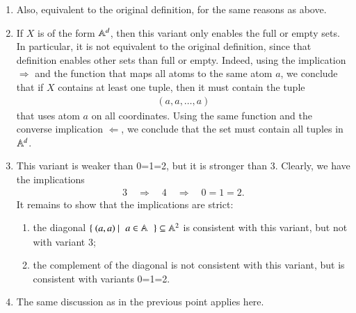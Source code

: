 {\begin{enumerate}
\begin{align*}
            (a_1,\ldots,a_d) \in X 
            \quad \Leftarrow \quad
            (\pi(a_1),\ldots,\pi(a_1)) \in X
            \end{align*}
        follows from  the left-to-right implication  (we use different variable names for clarity)
        \begin{align*}
            (b_1,\ldots,b_d) \in X 
            \quad \Rightarrow \quad
            (\sigma(b_1),\ldots,\sigma(b_1)) \in X
            \end{align*}
        in the special case of  $\sigma = \pi^{-1}$ and $b_i = \pi(a_i)$. 
        \item Also, equivalent to the original definition, for the same reasons as above. 
        \item If $X$ is of the form $\mathbb A^d$, then this variant only enables the full or empty sets. In particular, it is not equivalent to the original definition, since that definition enables other sets than full or empty.  Indeed, using the implication $\Rightarrow$ and the function that maps all atoms to the same atom $a$,   we conclude that if $X$ contains at least one tuple, then it must contain the tuple 
            \begin{align*}
            (a,a,\ldots,a)
            \end{align*}
        that uses  atom $a$ on all coordinates.  Using the same function and the converse implication $\Leftarrow$, we conclude that the set must contain all tuples in $\mathbb A^d$. 
        \item This variant is weaker than 0=1=2, but it is stronger than 3. Clearly, we have the implications 
            \begin{align*}
            3 \quad \Rightarrow \quad 4 \quad \Rightarrow \quad 0=1=2.
            \end{align*}
        It remains to show that the implications are strict: 
            \begin{enumerate}
                \item the diagonal $\setbuild{(a,a)}{$a \in \atoms$} \subseteq \atoms^2$ is consistent with this variant, but not with variant 3;
                \item the complement of the diagonal is not consistent with this variant, but is consistent with variants 0=1=2.
            \end{enumerate}
        \item The same discussion as in the previous point applies here.
    \end{enumerate}

}



